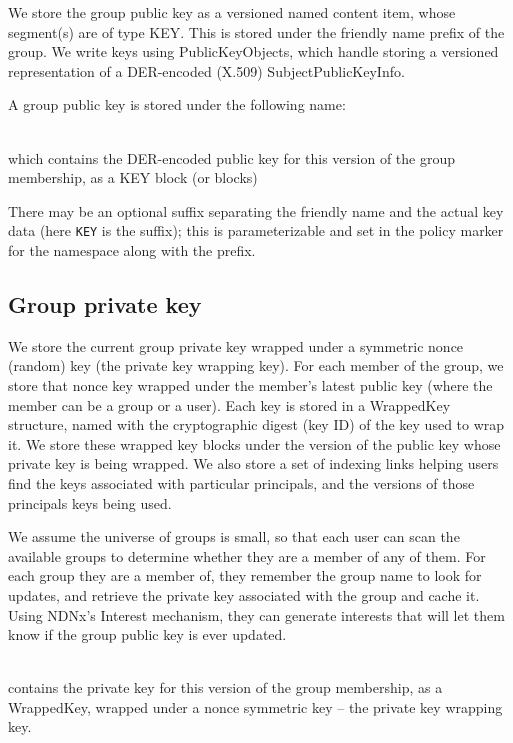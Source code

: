 We store the group public key as a versioned named content item, whose
segment(s) are of type KEY. This is stored under the friendly name
prefix of the group. We write keys using PublicKeyObjects, which
handle storing a versioned representation of a DER-encoded (X.509)
SubjectPublicKeyInfo.

A group public key is stored under the following name:

\\

which contains the DER-encoded public key for this version of the
group membership, as a KEY block (or blocks)

There may be an optional suffix separating the friendly name and the actual
key data (here {\tt KEY} is the suffix); this is parameterizable and set in the
policy marker for the namespace along with the prefix.

\subsection{Group private key}

We store the current group private key wrapped under a symmetric nonce
(random) key (the private key wrapping key). For each member of the
group, we store that nonce key wrapped under the member's latest
public key (where the member can be a group or a user). Each key is
stored in a WrappedKey structure, named with the cryptographic digest
(key ID) of the key used to wrap it. We store these wrapped key blocks
under the version of the public key whose private key is being
wrapped. We also store a set of indexing links helping users find the
keys associated with particular principals, and the versions of those
principals keys being used.

We assume the universe of groups is small, so that each user can scan
the available groups to determine whether they are a member of any of
them. For each group they are a member of, they remember the group
name to look for updates, and retrieve the private key associated with
the group and cache it. Using NDNx's Interest mechanism, they can
generate interests that will let them know if the group public key is
ever updated.

\\
contains the private key for this version of the group membership, as
a WrappedKey, wrapped under a nonce symmetric key -- the private key
wrapping key.

